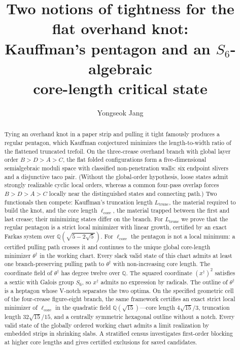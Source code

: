 \documentclass[11pt]{amsart}
\title[Two notions of tightness for the flat overhand knot]{Two notions of tightness for the flat overhand knot:\\ Kauffman's pentagon and an $S_6$-algebraic\\ core-length critical state}
\author{Yongseok Jang}
\date{}
\theoremstyle{plain}
\theoremstyle{definition}
\theoremstyle{remark}
\newcommand{\core}{\ell_{\mathrm{core}}}
\newcommand{\trunc}{L_{\mathrm{trunc}}}
\newcommand{\td}{\theta^\dagger}
\newcommand{\Q}{\mathbb{Q}}
\begin{document}
\begin{abstract}
Tying an overhand knot in a paper strip and pulling it tight famously produces a regular pentagon, which Kauffman conjectured minimizes the length-to-width ratio of the flattened truncated trefoil. On the three-crease overhand branch with global layer order $B>D>A>C$, the flat folded configurations form a five-dimensional semialgebraic moduli space with classified non-penetration walls: six endpoint slivers and a disjunctive taco pair. (Without the global-order hypothesis, loose states admit strongly realizable cyclic local orders, whereas a common four-pass overlap forces $B>D>A>C$ locally near the distinguished states and connecting path.) Two functionals then compete: Kauffman's truncation length $\trunc$, the material required to build the knot, and the core length $\core$, the material trapped between the first and last crease; their minimizing states differ on the branch. For $\trunc$ we prove that the regular pentagon is a strict local minimizer with linear growth, certified by an exact Farkas system over $\Q(\sqrt{5-2\sqrt5})$. For $\core$ the pentagon is not a local minimum: a certified pulling path crosses it and continues to the unique global core-length minimizer $\td$ in the working chart. Every slack valid state of this chart admits at least one branch-preserving pulling path to $\td$ with non-increasing core length. The coordinate field of $\td$ has degree twelve over $\Q$. The squared coordinate $(x^\dagger)^2$ satisfies a sextic with Galois group $S_6$, so $x^\dagger$ admits no expression by radicals. The outline of $\td$ is a heptagon whose V-notch separates the two optima. On the specified geometric cell of the four-crease figure-eight branch, the same framework certifies an exact strict local minimizer of $\core$ in the quadratic field $\Q(\sqrt{15})$---core length $4\sqrt{15}/3$, truncation length $32\sqrt{15}/15$, and a centrally symmetric hexagonal outline without a notch. Every valid state of the globally ordered working chart admits a limit realization by embedded strips in shrinking slabs. A stratified census investigates first-order blocking at higher core lengths and gives certified exclusions for saved candidates.
\end{abstract}

\maketitle





\end{document}
